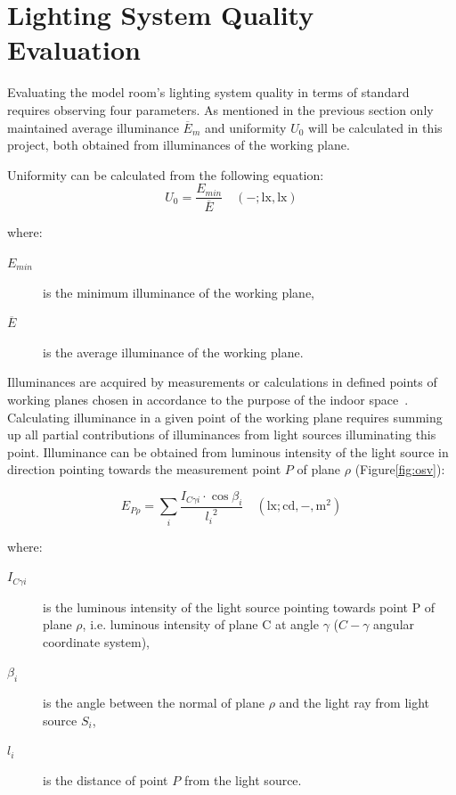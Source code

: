 \section{Lighting System Quality Evaluation}
Evaluating the model room's lighting system quality in terms of standard \cite{12464} requires observing four parameters. As mentioned in the previous section only maintained average illuminance $\overline{E}_{m}$ and uniformity $U_{0}$ will be calculated in this project, both obtained from illuminances of the working plane.

Uniformity can be calculated from the following equation:
\begin{equation}
U_{0}=\frac{E_{min}}{\overline{E}} \quad \mathrm{(-;lx,lx)}
\end{equation}

where:
\begin{description}
	\item[$E_{min}$] is the minimum illuminance of the working plane,
	\item[$\overline{E}$] is the average illuminance of the working plane.
\end{description}

Illuminances are acquired by measurements or calculations in defined points of working planes chosen in accordance to the purpose of the indoor space~\cite{12464}. Calculating illuminance in a given point of the working plane requires summing up all partial contributions of illuminances from light sources illuminating this point. Illuminance can be obtained from luminous intensity of the light source in direction pointing towards the measurement point $P$ of plane $\rho$ (Figure\ref{fig:osv}):

\begin{equation}
E_{P\rho}=\sum_{i} \frac{I_{C \gamma i} \cdot \cos{\beta_{i}}}{{l_{i}}^{2}} \quad \mathrm{(lx;cd,-,m^{2})}
\label{eq:illSum}
\end{equation}

where:
\begin{description}
	\item[$I_{C \gamma i}$] is the luminous intensity of the light source pointing towards point P of plane $\rho$, i.e. luminous intensity of plane C at angle $\gamma$ ($C-\gamma$ angular coordinate system),
	\item[$\beta_{i}$] is the angle between the normal of plane $\rho$ and the light ray from light source $S_{i}$,
	\item[$l_{i}$] is the distance of point $P$ from the light source.
\end{description}

